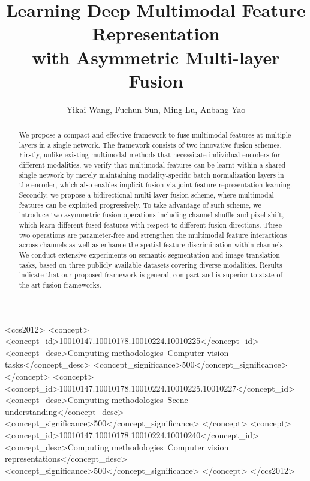 \documentclass[sigconf]{acmart}
\begin{document}
\fancyhead{}

\title{Learning Deep Multimodal Feature Representation\\with Asymmetric Multi-layer Fusion}

\author{Yikai Wang, Fuchun Sun, Ming Lu, Anbang Yao} 


\renewcommand{\shortauthors}{Y. Wang, F. Sun, M. Lu and A. Yao}



\begin{abstract}
We propose a compact and effective framework to fuse multimodal features at multiple layers in a single network. The framework consists of two innovative fusion schemes. Firstly, unlike existing multimodal methods that necessitate individual encoders for different modalities, we verify that multimodal features can be learnt within a shared single network by merely maintaining modality-specific batch normalization layers in the encoder, which also enables implicit fusion via joint feature representation learning. Secondly, we propose a bidirectional multi-layer fusion scheme, where multimodal features can be exploited progressively. To take advantage of such scheme, we introduce two asymmetric fusion operations including channel shuffle and pixel shift, which learn different fused features with respect to different fusion directions. These two operations are parameter-free and strengthen the multimodal feature interactions across channels as well as enhance the spatial feature discrimination within channels. We conduct extensive experiments on semantic segmentation and image translation tasks, based on three publicly available datasets covering diverse modalities. Results indicate that our proposed framework is general, compact and is superior to state-of-the-art fusion frameworks.
\end{abstract}

\begin{CCSXML}
<ccs2012>
   <concept>
       <concept_id>10010147.10010178.10010224.10010225</concept_id>
       <concept_desc>Computing methodologies~Computer vision tasks</concept_desc>
       <concept_significance>500</concept_significance>
       </concept>
   <concept>
       <concept_id>10010147.10010178.10010224.10010225.10010227</concept_id>
       <concept_desc>Computing methodologies~Scene understanding</concept_desc>
       <concept_significance>500</concept_significance>
       </concept>
   <concept>
       <concept_id>10010147.10010178.10010224.10010240</concept_id>
       <concept_desc>Computing methodologies~Computer vision representations</concept_desc>
       <concept_significance>500</concept_significance>
       </concept>
 </ccs2012>
\end{CCSXML}
\end{document}
